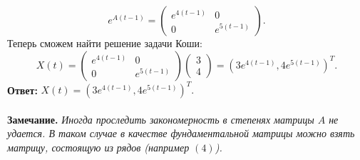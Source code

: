 \documentclass[a4paper, 12pt]{article}
\begin{document}
$$e^{A(t-1)} = \begin{pmatrix}
	e^{4(t-1)} & 0\\
	0 & e^{5(t-1)}
\end{pmatrix}.$$ Теперь сможем найти решение задачи Коши:
$$X(t) = \begin{pmatrix}
	e^{4(t-1)} & 0\\
	0 & e^{5(t-1)}
\end{pmatrix} \begin{pmatrix}
3\\4
\end{pmatrix} = (3	e^{4(t-1)}, 4e^{5(t-1)})^T.$$
\textbf{Ответ:} $X(t) = (3	e^{4(t-1)}, 4e^{5(t-1)})^T.$\\\\
\textbf{Замечание.} \textit{Иногда проследить закономерность в степенях матрицы $A$ не удается. В таком случае в качестве фундаментальной матрицы можно взять матрицу, состоящую из рядов (например $(4)$).}
\end{document}
